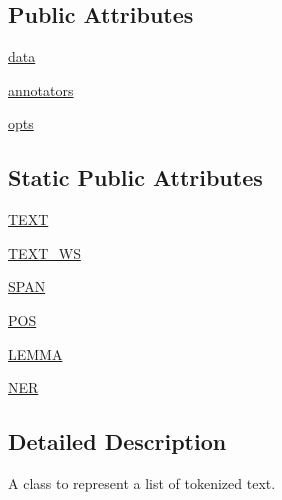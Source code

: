 \subsection*{Public Attributes}
\begin{DoxyCompactItemize}
\item 
\hyperlink{classparlai_1_1agents_1_1tfidf__retriever_1_1tokenizers_1_1tokenizer_1_1Tokens_ad5068b92d72245d43fd75dbb4c070a27}{data}
\item 
\hyperlink{classparlai_1_1agents_1_1tfidf__retriever_1_1tokenizers_1_1tokenizer_1_1Tokens_a394834203475385444a933440dcdd026}{annotators}
\item 
\hyperlink{classparlai_1_1agents_1_1tfidf__retriever_1_1tokenizers_1_1tokenizer_1_1Tokens_ada7339fd7da0200a4260970771f9bfe9}{opts}
\end{DoxyCompactItemize}
\subsection*{Static Public Attributes}
\begin{DoxyCompactItemize}
\item 
\hyperlink{classparlai_1_1agents_1_1tfidf__retriever_1_1tokenizers_1_1tokenizer_1_1Tokens_a95137955c2cf11d2d28434ece03adf7a}{T\+E\+XT}
\item 
\hyperlink{classparlai_1_1agents_1_1tfidf__retriever_1_1tokenizers_1_1tokenizer_1_1Tokens_a319701df20f2f209c615adbab8c445f4}{T\+E\+X\+T\+\_\+\+WS}
\item 
\hyperlink{classparlai_1_1agents_1_1tfidf__retriever_1_1tokenizers_1_1tokenizer_1_1Tokens_a53956921f62121488f2ff918f0692bf9}{S\+P\+AN}
\item 
\hyperlink{classparlai_1_1agents_1_1tfidf__retriever_1_1tokenizers_1_1tokenizer_1_1Tokens_a10bd510e7cf4ee6c633ce7fec8aadbaf}{P\+OS}
\item 
\hyperlink{classparlai_1_1agents_1_1tfidf__retriever_1_1tokenizers_1_1tokenizer_1_1Tokens_ae82009092f014a3458777aeb5427ccf4}{L\+E\+M\+MA}
\item 
\hyperlink{classparlai_1_1agents_1_1tfidf__retriever_1_1tokenizers_1_1tokenizer_1_1Tokens_a730dffdd2e5c859fb396c707830a6633}{N\+ER}
\end{DoxyCompactItemize}


\subsection{Detailed Description}
\begin{DoxyVerb}A class to represent a list of tokenized text.
\end{DoxyVerb}
 

